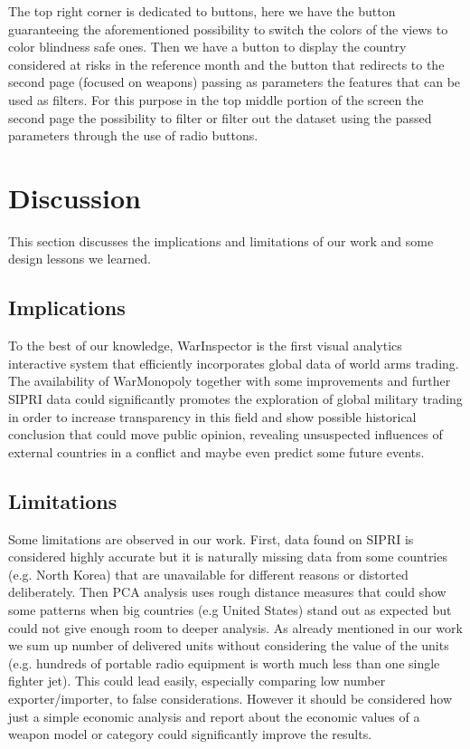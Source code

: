 \documentclass{article}
\begin{document}
\begin{multicols}{2}
The top right corner is dedicated to buttons, here we have the
button guaranteeing the aforementioned possibility to switch the colors of the views to color blindness safe ones. Then we have a button to display the country considered at risks in the reference month and the button that redirects to the second page (focused on weapons) passing as parameters the features that can be used as filters.
For this purpose in the top middle portion of the screen the second page the possibility to filter or filter out the dataset using the passed parameters through the use of radio buttons.


\section{Discussion}

This section discusses the implications and limitations of our work and some design lessons we learned.
\subsection{Implications}
To the best of our knowledge, WarInspector is the first visual analytics interactive system that efficiently incorporates  global data of world arms trading. The availability of WarMonopoly together with some improvements and further SIPRI data could 
significantly promotes the exploration of global military trading in order to increase transparency in this field and show possible historical conclusion that could move public opinion, revealing unsuspected influences of external countries in a conflict and maybe even predict some future events. 

\subsection{Limitations}

Some limitations are observed in our work. First, data found on SIPRI is considered highly accurate but it is naturally missing data from some countries (e.g. North Korea) that are unavailable for different reasons or distorted deliberately. Then PCA analysis uses rough distance measures that could show some patterns when big countries (e.g United States) stand out as expected but could not give enough room to deeper analysis.
As already mentioned in our work we sum up number of delivered units without considering the value of the units (e.g. hundreds of portable radio equipment is worth much less than one single fighter jet). This could lead easily, especially comparing low number exporter/importer, to false considerations. However it should be considered how just a simple economic analysis and report about the economic values of a weapon model or category could significantly improve the results.





\end{multicols}
\end{document}
